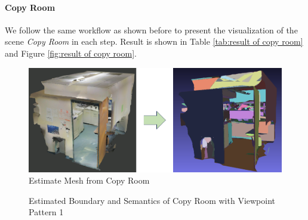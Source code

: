 \documentclass[11pt, a4paper,oneside,chapterprefix=false]{scrbook}
\begin{document}
\vspace{30pt}

\paragraph{Copy Room}

We follow the same workflow as shown before to present the visualization of the scene \emph{Copy Room} in each step. Result is shown in Table \ref{tab:result of copy room} and Figure \ref{fig:result of copy room}.

\vspace{30pt}

\begin{figure}[H]
    \centering
    \includegraphics*[width=1.0\textwidth, height=0.4\textwidth]{figures/estimate copy.png}
    \caption{Estimate Mesh from Copy Room}
    \label{fig:estimate mesh from copy room}
\end{figure}

\begin{figure}[H]
    \centering
      \label{fig:copy b 200 0} \hfill
     \label{fig:copy s 200 0}
    \caption{Estimated Boundary and Semantics of Copy Room with Viewpoint Pattern 1}
    \label{fig:copy 0}
\end{figure}
\end{document}
